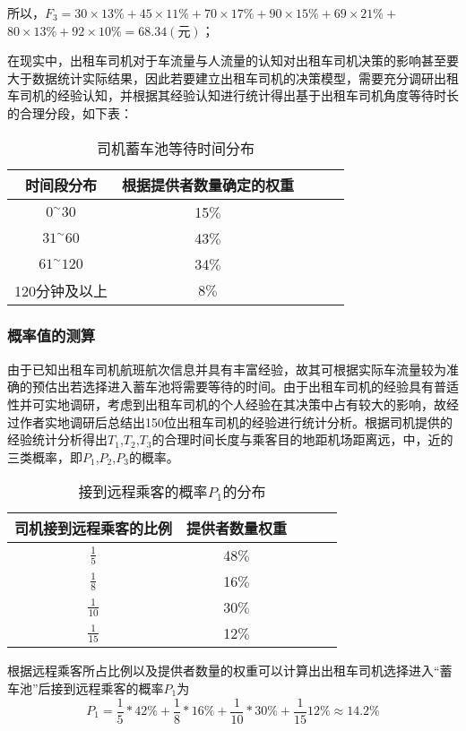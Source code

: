 \documentclass[withoutpreface,bwprint]{cumcmthesis} %
\begin{document}
所以，$F_{3}=30 \times 13 \%+45 \times 11 \%+70 \times 17 \%+90 \times 15 \%+69 \times 21 \%+$
$80 \times 13 \%+92 \times 10 \%=68.34({\text{元}}) $；

在现实中，出租车司机对于车流量与人流量的认知对出租车司机决策的影响甚至要大于数据统计实际结果，因此若要建立出租车司机的决策模型，需要充分调研出租车司机的经验认知，并根据其经验认知进行统计得出基于出租车司机角度等待时长的合理分段，如下表：

\begin{table}[!htbp]
	\caption{司机蓄车池等待时间分布}\label{tab:001} \centering
	\begin{tabular}{ccccc}
		\toprule[2pt]
		时间段分布& 根据提供者数量确定的权重\\
		\midrule[1pt]
		$0^{\sim} 30$ & 15$\%$\\
		$31^{\sim} 60$ & 43$\%$\\
		$61^{\sim} 120$ & 34$\%$\\
		120分钟及以上 & 8$\%$\\
		\bottomrule[1.5pt]
	\end{tabular}
\end{table}

\subsubsection{概率值的测算}
由于已知出租车司机航班航次信息并具有丰富经验，故其可根据实际车流量较为准确的预估出若选择进入蓄车池将需要等待的时间。由于出租车司机的经验具有普适性并可实地调研，考虑到出租车司机的个人经验在其决策中占有较大的影响，故经过作者实地调研后总结出150位出租车司机的经验进行统计分析。根据司机提供的经验统计分析得出$T_1$,$T_2$,$T_3$的合理时间长度与乘客目的地距机场距离远，中，近的三类概率，即$P_1$,$P_2$,$P_3$的概率。
\begin{table}[!htbp]
	\caption{接到远程乘客的概率$P_1$的分布}\label{tab:001} \centering
	\begin{tabular}{ccccc}
		\toprule[1.5pt]
		司机接到远程乘客的比例& 提供者数量权重\\
		\midrule[1pt]
		$\frac{1}{5}$ & 48$\%$\\
		$\frac{1}{8}$ & 16$\%$\\
		$\frac{1}{10}$ & 30$\%$\\
		$\frac{1}{15}$ & 12$\%$\\
		\bottomrule[1.5pt]
	\end{tabular}
\end{table}

根据远程乘客所占比例以及提供者数量的权重可以计算出出租车司机选择进入“蓄车池”后接到远程乘客的概率$P_1$为
$$
P_{1}=\frac{1}{5} * 42 \%+\frac{1}{8} * 16 \%+\frac{1}{10} * 30 \%+\frac{1}{15} 12 \% \approx 14.2 \%
$$
\end{document}
